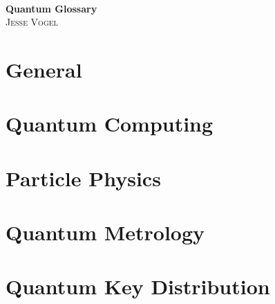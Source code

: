 \documentclass[10pt]{report}
\begin{document}
\thispagestyle{empty}

\begin{center}
    \; \\ \vspace{4cm} \textbf{\Huge Quantum Glossary}
    \\ \vspace{2cm}
    \textsc{Jesse Vogel}
\end{center}

\newpage

{
    \tableofcontents
}

\newcommand{\cat}{}

\chapter{General}
\renewcommand{\cat}{GEN}


\chapter{Quantum Computing}
\renewcommand{\cat}{COM}





\chapter{Particle Physics}
\renewcommand{\cat}{PAR}


\chapter{Quantum Metrology}
\renewcommand{\cat}{MET}


\chapter{Quantum Key Distribution}
\renewcommand{\cat}{MET}

\end{document}
